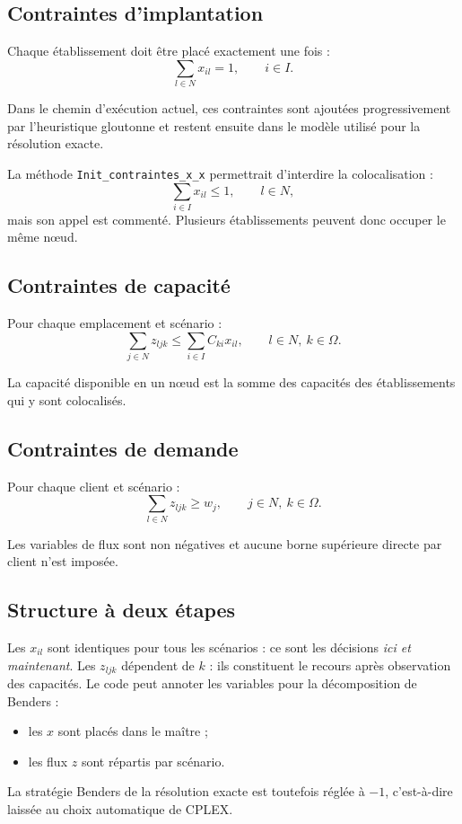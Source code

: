 \documentclass[11pt,a4paper]{article}
\newcommand{\code}[1]{\texttt{#1}}
\begin{document}
\subsection{Contraintes d'implantation}

Chaque établissement doit être placé exactement une fois :
\begin{equation}
\sum_{l\in N}x_{il}=1,
\qquad i\in I.
\label{eq:localisation}
\end{equation}

Dans le chemin d'exécution actuel, ces contraintes sont ajoutées
progressivement par l'heuristique gloutonne et restent ensuite dans le modèle
utilisé pour la résolution exacte.

La méthode \code{Init\_contraintes\_x\_x} permettrait d'interdire la
colocalisation :
\[
\sum_{i\in I}x_{il}\leq 1,\qquad l\in N,
\]
mais son appel est commenté. Plusieurs établissements peuvent donc occuper le
même nœud.

\subsection{Contraintes de capacité}

Pour chaque emplacement et scénario :
\begin{equation}
\sum_{j\in N}z_{ljk}
\leq
\sum_{i\in I}C_{ki}x_{il},
\qquad l\in N,\ k\in\Omega.
\label{eq:capacite}
\end{equation}

La capacité disponible en un nœud est la somme des capacités des
établissements qui y sont colocalisés.

\subsection{Contraintes de demande}

Pour chaque client et scénario :
\begin{equation}
\sum_{l\in N}z_{ljk}\geq w_j,
\qquad j\in N,\ k\in\Omega.
\label{eq:demande}
\end{equation}

Les variables de flux sont non négatives et aucune borne supérieure directe
par client n'est imposée.

\subsection{Structure à deux étapes}

Les $x_{il}$ sont identiques pour tous les scénarios : ce sont les décisions
\emph{ici et maintenant}. Les $z_{ljk}$ dépendent de $k$ : ils constituent le
recours après observation des capacités. Le code peut annoter les variables
pour la décomposition de Benders :
\begin{itemize}
  \item les $x$ sont placés dans le maître ;
  \item les flux $z$ sont répartis par scénario.
\end{itemize}
La stratégie Benders de la résolution exacte est toutefois réglée à $-1$,
c'est-à-dire laissée au choix automatique de CPLEX.
\end{document}
